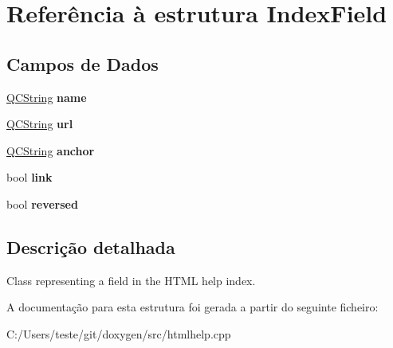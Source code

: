 \hypertarget{struct_index_field}{\section{Referência à estrutura Index\-Field}
\label{struct_index_field}
}
\subsection*{Campos de Dados}
\begin{DoxyCompactItemize}
\item 
\hypertarget{struct_index_field_adc0097c7bd1e61ad32058fcde425bc7a}{\hyperlink{class_q_c_string}{Q\-C\-String} {\bfseries name}}\label{struct_index_field_adc0097c7bd1e61ad32058fcde425bc7a}

\item 
\hypertarget{struct_index_field_ae460a12583d5413f9b10d653d645416e}{\hyperlink{class_q_c_string}{Q\-C\-String} {\bfseries url}}\label{struct_index_field_ae460a12583d5413f9b10d653d645416e}

\item 
\hypertarget{struct_index_field_a77f4824b029885f469aa2903eabf92d4}{\hyperlink{class_q_c_string}{Q\-C\-String} {\bfseries anchor}}\label{struct_index_field_a77f4824b029885f469aa2903eabf92d4}

\item 
\hypertarget{struct_index_field_abc06c90a7055096af0d2bcb98ebe4d97}{bool {\bfseries link}}\label{struct_index_field_abc06c90a7055096af0d2bcb98ebe4d97}

\item 
\hypertarget{struct_index_field_adf0003dbe20bfc38bc26c553be43c6fd}{bool {\bfseries reversed}}\label{struct_index_field_adf0003dbe20bfc38bc26c553be43c6fd}

\end{DoxyCompactItemize}


\subsection{Descrição detalhada}
Class representing a field in the H\-T\-M\-L help index. 

A documentação para esta estrutura foi gerada a partir do seguinte ficheiro\-:\begin{DoxyCompactItemize}
\item 
C\-:/\-Users/teste/git/doxygen/src/htmlhelp.\-cpp\end{DoxyCompactItemize}
